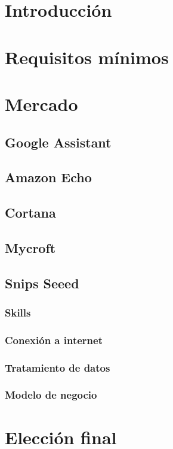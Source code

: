 \section{Introducción}

\section{Requisitos mínimos}

\section{Mercado}

    \subsection{Google Assistant}
    \subsection{Amazon Echo}
    \subsection{Cortana}
    \subsection{Mycroft}
    \subsection{Snips Seeed}
        \subsubsection{Skills}
        \subsubsection{Conexión a internet}
        \subsubsection{Tratamiento de datos}
        \subsubsection{Modelo de negocio}

\section{Elección final}

